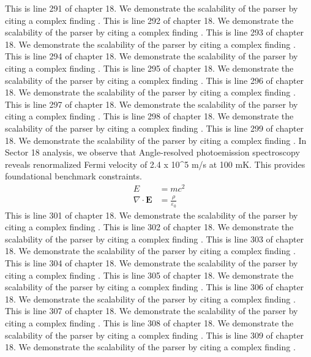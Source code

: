 This is line 291 of chapter 18. We demonstrate the scalability of the parser by citing a complex finding \cite{ref18_291}.
This is line 292 of chapter 18. We demonstrate the scalability of the parser by citing a complex finding \cite{ref18_292}.
This is line 293 of chapter 18. We demonstrate the scalability of the parser by citing a complex finding \cite{ref18_293}.
This is line 294 of chapter 18. We demonstrate the scalability of the parser by citing a complex finding \cite{ref18_294}.
This is line 295 of chapter 18. We demonstrate the scalability of the parser by citing a complex finding \cite{ref18_295}.
This is line 296 of chapter 18. We demonstrate the scalability of the parser by citing a complex finding \cite{ref18_296}.
This is line 297 of chapter 18. We demonstrate the scalability of the parser by citing a complex finding \cite{ref18_297}.
This is line 298 of chapter 18. We demonstrate the scalability of the parser by citing a complex finding \cite{ref18_298}.
This is line 299 of chapter 18. We demonstrate the scalability of the parser by citing a complex finding \cite{ref18_299}.
In Sector 18 analysis, we observe that Angle-resolved photoemission spectroscopy reveals renormalized Fermi velocity of 2.4 x 10^5 m/s at 100 mK. This provides foundational benchmark constraints.
\begin{align*}
  E &= mc^2 \\
  \nabla \cdot \mathbf{E} &= \frac{\rho}{\varepsilon_0}
\end{align*}
This is line 301 of chapter 18. We demonstrate the scalability of the parser by citing a complex finding \cite{ref18_301}.
This is line 302 of chapter 18. We demonstrate the scalability of the parser by citing a complex finding \cite{ref18_302}.
This is line 303 of chapter 18. We demonstrate the scalability of the parser by citing a complex finding \cite{ref18_303}.
This is line 304 of chapter 18. We demonstrate the scalability of the parser by citing a complex finding \cite{ref18_304}.
This is line 305 of chapter 18. We demonstrate the scalability of the parser by citing a complex finding \cite{ref18_305}.
This is line 306 of chapter 18. We demonstrate the scalability of the parser by citing a complex finding \cite{ref18_306}.
This is line 307 of chapter 18. We demonstrate the scalability of the parser by citing a complex finding \cite{ref18_307}.
This is line 308 of chapter 18. We demonstrate the scalability of the parser by citing a complex finding \cite{ref18_308}.
This is line 309 of chapter 18. We demonstrate the scalability of the parser by citing a complex finding \cite{ref18_309}.
